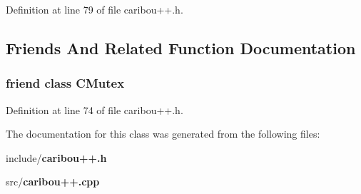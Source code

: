 Definition at line 79 of file caribou++.\-h.



\subsection{Friends And Related Function Documentation}
\subsubsection[{C\-Mutex}]{\setlength{\rightskip}{0pt plus 5cm}friend class {\bf C\-Mutex}\hspace{0.3cm}{\ttfamily [friend]}}\label{class_c_a_r_i_b_o_u_1_1_c_caribou_main_thread_a5c4fbf524d17a38ae855309d3f525269}


Definition at line 74 of file caribou++.\-h.



The documentation for this class was generated from the following files\-:\begin{DoxyCompactItemize}
\item 
include/{\bf caribou++.\-h}\item 
src/{\bf caribou++.\-cpp}\end{DoxyCompactItemize}
